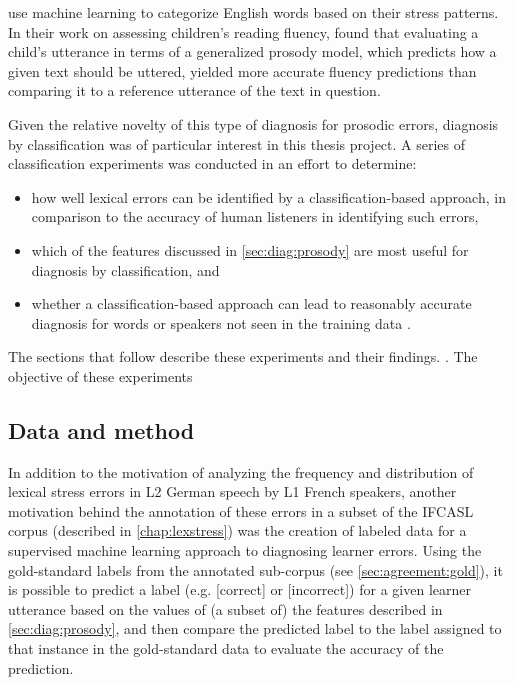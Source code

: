 	\textcite{Shahin2012a,Kim2011} use machine learning to categorize English words based on their stress patterns.
	 In their work on assessing children's reading fluency, \textcite{Duong2011} found that evaluating a child's utterance in terms of a generalized prosody model, which predicts how a given text should be uttered, yielded more accurate fluency predictions than comparing it to a reference utterance of the text in question. 
	 
	 
	 Given the relative novelty of this type of diagnosis for prosodic errors, diagnosis by classification was of particular interest in this thesis project. A series of classification experiments was conducted in an effort to determine:
	 \begin{itemize}
	 \item how well lexical errors can be identified by a classification-based approach, in comparison to the accuracy of human listeners in identifying such errors,
	 \item which of the features discussed in \cref{sec:diag:prosody} are most useful for diagnosis by classification, and 
	 \item whether a classification-based approach can lead to reasonably accurate diagnosis for words or speakers not seen in the training data .
	 \end{itemize}
	 The sections that follow describe these experiments and their findings. . 
	 The objective of these experiments 
	 
	\subsection{Data and method}
	\label{sec:classification:datamethod}
		
		In addition to the motivation of analyzing the frequency and distribution of lexical stress errors in L2 German speech by L1 French speakers, another motivation behind the annotation of these errors in a subset of the IFCASL corpus (described in \cref{chap:lexstress}) was the creation of labeled data for a supervised machine learning approach to diagnosing learner errors. Using the gold-standard labels from the annotated sub-corpus (see \cref{sec:agreement:gold}), it is possible to predict a label (e.g. [correct] or [incorrect]) for a given learner utterance based on the values of (a subset of) the features described in \cref{sec:diag:prosody}, and then compare the predicted label to the label assigned to that instance in the gold-standard data to evaluate the accuracy of the prediction. 
		

